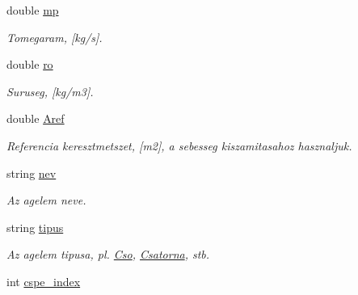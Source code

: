 \begin{DoxyCompactItemize}
\item 
\hypertarget{class_agelem_a1377d80d8511cc4adacccba31d28282d}{}\label{class_agelem_a1377d80d8511cc4adacccba31d28282d} 
double \hyperlink{class_agelem_a1377d80d8511cc4adacccba31d28282d}{mp}
\begin{DoxyCompactList}\small\item\em Tomegaram, \mbox{[}kg/s\mbox{]}. \end{DoxyCompactList}\item 
\hypertarget{class_agelem_a520072191e53f368a04ca80b8b583a3f}{}\label{class_agelem_a520072191e53f368a04ca80b8b583a3f} 
double \hyperlink{class_agelem_a520072191e53f368a04ca80b8b583a3f}{ro}
\begin{DoxyCompactList}\small\item\em Suruseg, \mbox{[}kg/m3\mbox{]}. \end{DoxyCompactList}\item 
\hypertarget{class_agelem_a3f8668febc2958fd539997d537552f17}{}\label{class_agelem_a3f8668febc2958fd539997d537552f17} 
double \hyperlink{class_agelem_a3f8668febc2958fd539997d537552f17}{Aref}
\begin{DoxyCompactList}\small\item\em Referencia keresztmetszet, \mbox{[}m2\mbox{]}, a sebesseg kiszamitasahoz hasznaljuk. \end{DoxyCompactList}\item 
\hypertarget{class_agelem_abe92b7e3912367d5d1caf6b277ca0b7d}{}\label{class_agelem_abe92b7e3912367d5d1caf6b277ca0b7d} 
string \hyperlink{class_agelem_abe92b7e3912367d5d1caf6b277ca0b7d}{nev}
\begin{DoxyCompactList}\small\item\em Az agelem neve. \end{DoxyCompactList}\item 
\hypertarget{class_agelem_a6e1c3128174609a0dd8fbee09c0d9162}{}\label{class_agelem_a6e1c3128174609a0dd8fbee09c0d9162} 
string \hyperlink{class_agelem_a6e1c3128174609a0dd8fbee09c0d9162}{tipus}
\begin{DoxyCompactList}\small\item\em Az agelem tipusa, pl. \hyperlink{class_cso}{Cso}, \hyperlink{class_csatorna}{Csatorna}, stb. \end{DoxyCompactList}\item 
\hypertarget{class_agelem_a9639c0a7a0165b644d62033e24eb6d24}{}\label{class_agelem_a9639c0a7a0165b644d62033e24eb6d24} 
int \hyperlink{class_agelem_a9639c0a7a0165b644d62033e24eb6d24}{cspe\+\_\+index}

\end{DoxyCompactItemize}
